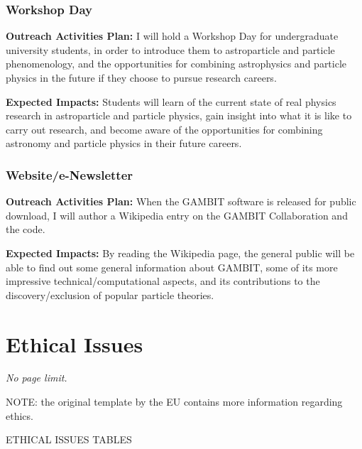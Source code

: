 \documentclass[a4paper,11pt]{article}
\newenvironment{xcomment}{\em}{}
\begin{document}
\subsubsection{Workshop Day}
 
\textbf{Outreach Activities Plan:} I will hold a Workshop Day for undergraduate university students, in order to introduce them to astroparticle and particle phenomenology, and the opportunities for combining astrophysics and particle physics in the future if they choose to pursue research careers.\vspace{3mm}

\noindent\textbf{Expected Impacts:} Students will learn of the current state of real physics research in astroparticle and particle physics, gain insight into what it is like to carry out research, and become aware of the opportunities for combining astronomy and particle physics in their future careers.

\subsubsection{Website/e-Newsletter}

\textbf{Outreach Activities Plan:} When the GAMBIT software is released for public download, I will author a Wikipedia entry on the GAMBIT Collaboration and the code.\vspace{3mm}

\noindent\textbf{Expected Impacts:} By reading the Wikipedia page, the general public will be able to find out some general information about GAMBIT, some of its more impressive technical/computational aspects, and its contributions to the discovery/exclusion of popular particle theories.


\newpage
\section{Ethical Issues}
\begin{xcomment}
  No page limit.

  NOTE: the original template by the EU contains more information regarding ethics.
\end{xcomment}

ETHICAL ISSUES TABLES
\vspace{5mm}
\end{document}
